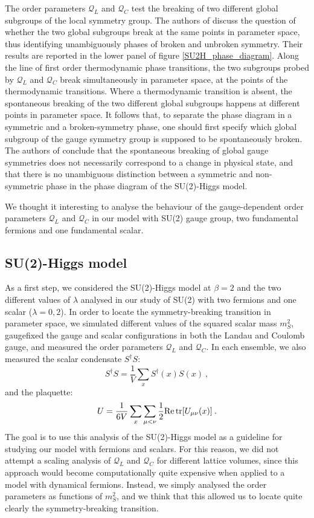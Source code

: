 The order parameters $\mathcal Q_L$ and $\mathcal Q_C$ test the breaking of two different global subgroups of the local symmetry group. The authors of \cite{Caudy:2007sf} discuss the question of whether the two global subgroups break at the same points in parameter space, thus identifying unambiguously phases of broken and unbroken symmetry. Their results are reported in the lower panel of figure \ref{SU2H_phase_diagram}. Along the line of first order thermodynamic phase transitions, the two subgroups probed by $\mathcal Q_L$ and $\mathcal Q_C$ break simultaneously in parameter space, at the points of the thermodynamic transitions. Where a thermodynamic transition is absent, the spontaneous breaking of the two different global subgroups happens at different points in parameter space. It follows that, to separate the phase diagram in a symmetric and a broken-symmetry phase, one should first specify which global subgroup of the gauge symmetry group is supposed to be spontaneously broken. The authors of \cite{Caudy:2007sf} conclude that the spontaneous breaking of global gauge symmetries does not necessarily correspond to a change in physical state, and that there is no unambiguous distinction between a symmetric and non-symmetric phase in the phase diagram of the SU(2)-Higgs model.

We thought it interesting to analyse the behaviour of the gauge-dependent order parameters $\mathcal Q_L$ and $\mathcal Q_C$ in our model with SU(2) gauge group, two fundamental fermions and one fundamental scalar.

\subsection{SU(2)-Higgs model}

As a first step, we considered the SU(2)-Higgs model at $\beta = 2$ and the two different values of $\lambda$ analysed in our study of SU(2) with two fermions and one scalar ($\lambda = 0, 2$). In order to locate the symmetry-breaking transition in parameter space, we simulated different values of the squared scalar mass $m_S^2$, gaugefixed the gauge and scalar configurations in both the Landau and Coulomb gauge, and measured the order parameters $\mathcal Q_L$ and $\mathcal Q_C$. In each ensemble, we also measured the scalar condensate $S^{\dagger} S$:
\begin{equation}
S^{\dagger} S = \frac{1}{V} \sum_x S^{\dagger}(x) S(x) \: ,
\end{equation}
%
and the plaquette:
\begin{equation}
U =  \frac{1}{6V} \sum_x \sum_{\mu < \nu} \frac{1}{2} \mathrm{Re} \tr[U_{\mu\nu}(x)] \: .
\end{equation}
%
The goal is to use this analysis of the SU(2)-Higgs model as a guideline for studying our model with fermions and scalars. For this reason, we did not attempt a scaling analysis of $\mathcal Q_L$ and $\mathcal Q_C$ for different lattice volumes, since this approach would become computationally quite expensive when applied to a model with dynamical fermions. Instead, we simply analysed the order parameters as functions of $m_S^2$, and we think that this allowed us to locate quite clearly the symmetry-breaking transition.

